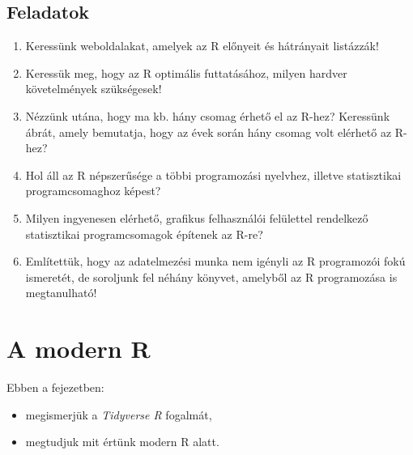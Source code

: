 \documentclass[
]{book}
\makeatletter
\providecommand{\tightlist}{%
  \setlength{\itemsep}{0pt}\setlength{\parskip}{0pt}}
\newenvironment{kframe}{%
\medskip{}
\setlength{\fboxsep}{.8em}
 \def\at@end@of@kframe{}%
 \ifinner\ifhmode%
  \def\at@end@of@kframe{\end{minipage}}%
  \begin{minipage}{\columnwidth}%
 \fi\fi%
 \def\FrameCommand##1{\hskip\@totalleftmargin \hskip-\fboxsep
 \colorbox{shadecolor}{##1}\hskip-\fboxsep
     \hskip-\linewidth \hskip-\@totalleftmargin \hskip\columnwidth}%
 \MakeFramed {\advance\hsize-\width
   \@totalleftmargin\z@ \linewidth\hsize
   \@setminipage}}%
 {\par\unskip\endMakeFramed%
 \at@end@of@kframe}
\newenvironment{rmdblock}[1]
  {
  \begin{itemize}
  \renewcommand{\labelitemi}{
    \raisebox{-.7\height}[0pt][0pt]{
      {\setkeys{Gin}{width=3em,keepaspectratio}\texttt{[image: images/\#1]}}
    }
  }
  \setlength{\fboxsep}{1em}
  \begin{kframe}
  \item
  }
  {
  \end{kframe}
  \end{itemize}
  }
\newenvironment{rmdlevel2}
  {\begin{rmdblock}{level2}}
  {\end{rmdblock}}
\newenvironment{rmdexercise}
  {\begin{rmdblock}{exercise}}
  {\end{rmdblock}}
\makeatother
\begin{document}
\hypertarget{mi-az-r-1-exercise}{%
\subsection{Feladatok}\label{mi-az-r-1-exercise}}

\begin{rmdexercise}
\begin{enumerate}
\def\labelenumi{\arabic{enumi}.}
\tightlist
\item
  Keressünk weboldalakat, amelyek az R előnyeit és hátrányait listázzák!
\item
  Keressük meg, hogy az R optimális futtatásához, milyen hardver követelmények szükségesek!
\item
  Nézzünk utána, hogy ma kb. hány csomag érhető el az R-hez? Keressünk ábrát, amely bemutatja, hogy az évek során hány csomag volt elérhető az R-hez?
\item
  Hol áll az R népszerűsége a többi programozási nyelvhez, illetve statisztikai programcsomaghoz képest?
\item
  Milyen ingyenesen elérhető, grafikus felhasználói felülettel rendelkező statisztikai programcsomagok építenek az R-re?
\item
  Említettük, hogy az adatelmezési munka nem igényli az R programozói fokú ismeretét, de soroljunk fel néhány könyvet, amelyből az R programozása is megtanulható!
\end{enumerate}
\end{rmdexercise}

\hypertarget{a-modern-r}{%
\section{A modern R}\label{a-modern-r}}

\begin{rmdlevel2}
Ebben a fejezetben:

\begin{itemize}
\tightlist
\item
  megismerjük a \emph{Tidyverse R} fogalmát,
\item
  megtudjuk mit értünk modern R alatt.
\end{itemize}
\end{rmdlevel2}
\end{document}
